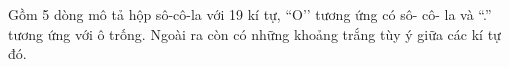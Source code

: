Gồm 5 dòng mô tả hộp sô-cô-la với 19 kí tự, “O’’ tương ứng có sô- cô- la và “.” tương ứng với ô trống. Ngoài ra còn có những khoảng trắng tùy ý giữa các kí tự đó.  

\